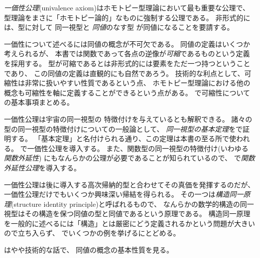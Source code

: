 \documentclass[index]{subfiles}
\begin{document}

\emph{一価性公理}(univalence axiom)はホモトピー型理論において最も重要な公理で、
型理論をまさに「ホモトピー論的」なものに強制する公理である。
非形式的には、型に対して
同一視型と
\emph{同値}のなす型
が同値になることを要請する。

一価性について述べるには同値の概念が不可欠である。
同値の定義はいくつか考えられるが、
本書では関数であって各点の逆像が\emph{可縮}であるものという定義を採用する。
型が可縮であるとは非形式的には要素をただ一つ持つということであり、
この同値の定義は直観的にも自然であろう。
技術的な利点として、可縮性は非常に扱いやすい性質であるという点、
ホモトピー型理論における他の概念も可縮性を軸に定義することができるという点がある。
で可縮性についての基本事項まとめる。

一価性公理は宇宙の同一視型の
特徴付けを与えているとも解釈できる。
諸々の型の同一視型の特徴付けについての一般論として、
\emph{同一視型の基本定理}をで証明する。
「基本定理」と名付けられる通り、この定理は本書の至る所で使われる。
で一価性公理を導入する。
また、関数型の同一視型の特徴付け(いわゆる\emph{関数外延性})
にもなんらかの公理が必要であることが知られているので、
で\emph{関数外延性公理}を導入する。

一価性公理は後に導入する高次帰納的型と合わせてその真価を発揮するのだが、
一価性公理だけでもいくつか興味深い帰結を得られる。
その一つは\emph{構造同一原理}(structure identity principle)と呼ばれるもので、
なんらかの数学的構造の同一視型はその構造を保つ同値の型と同値であるという原理である。
構造同一原理を一般的に述べるには「構造」とは厳密にどう定義されるかという問題が大きいので立ち入らず、
でいくつかの例を挙げるにとどめる。

はやや技術的な話で、
同値の概念の基本性質を見る。

\begin{mySubsections}
  
  
  
  
  
  
\end{mySubsections}
\end{document}
